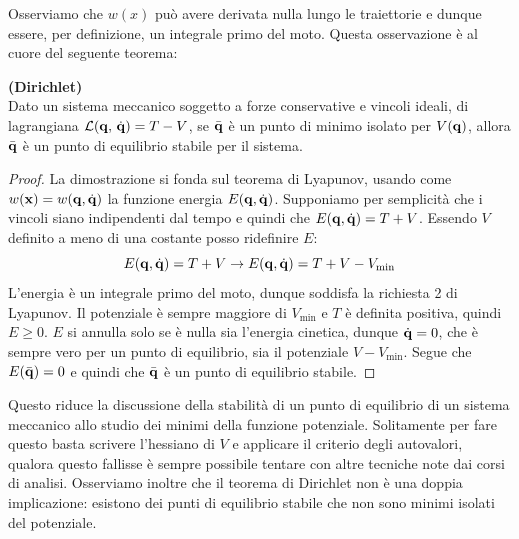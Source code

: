     Osserviamo che $w(x)$ può avere derivata nulla lungo le traiettorie e dunque essere, per definizione, un integrale primo del moto. Questa osservazione è al cuore del seguente teorema:
\begin{theorem}
    \textbf{(Dirichlet)}\\
    Dato un sistema meccanico soggetto a forze conservative e vincoli ideali, di lagrangiana $\mathcal{L}(\mathbf{q},\,\dot{\mathbf{q}}) = T-V$, se $\bar{\mathbf{q}}$ è un punto di minimo isolato per $V(\mathbf{q})$, allora $\bar{\mathbf{q}}$ è un punto di equilibrio stabile per il sistema.
\end{theorem}
\begin{proof}
    
    La dimostrazione si fonda sul teorema di Lyapunov, usando come $w(\mathbf{x}) = w(\mathbf{q}, \dot{\mathbf{q}})$ la funzione energia  $E(\mathbf{q},\dot{\mathbf{q}})$. Supponiamo per semplicità che i vincoli siano indipendenti dal tempo e quindi che $E(\mathbf{q},\dot{\mathbf{q}}) = T+V$. Essendo $V$ definito a meno di una costante posso ridefinire $E$:
    \begin{equation}
        E(\mathbf{q},\dot{\mathbf{q}}) = T+V \to E(\mathbf{q},\dot{\mathbf{q}}) = T+V -V_{\mathrm{min}}
    \end{equation}
    L'energia è un integrale primo del moto, dunque soddisfa la richiesta 2 di Lyapunov. Il potenziale è sempre maggiore di $V_\mathrm{min}$ e $T$ è definita positiva, quindi $E\geq0$. $E$ si annulla solo se è nulla sia l'energia cinetica, dunque $\dot{\mathbf{q}}=0$, che è sempre vero per un punto di equilibrio, sia il potenziale $V-V_\mathrm{min}$. Segue che $E(\bar{\mathbf{q}})=0$ e quindi che $\bar{\mathbf{q}}$ è un punto di equilibrio stabile.
\end{proof}
    Questo riduce la discussione della stabilità di un punto di equilibrio di un sistema meccanico allo studio dei minimi della funzione potenziale. Solitamente per fare questo basta scrivere l'hessiano di $V$ e applicare il criterio degli autovalori, qualora questo fallisse è sempre possibile tentare con altre tecniche note dai corsi di analisi. Osserviamo inoltre che il teorema di Dirichlet non è una doppia implicazione: esistono dei punti di equilibrio stabile che non sono minimi isolati del potenziale.
    
